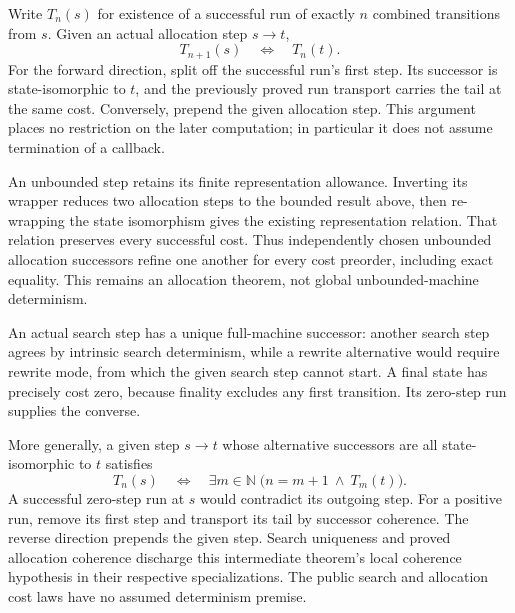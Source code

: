 Write $T_n(s)$ for existence of a successful run of exactly $n$ combined
transitions from $s$. Given an actual allocation step $s\to t$,
\[
 T_{n+1}(s)\quad\Longleftrightarrow\quad T_n(t).
\]
For the forward direction, split off the successful run's first step. Its
successor is state-isomorphic to $t$, and the previously proved run transport
carries the tail at the same cost. Conversely, prepend the given allocation
step. This argument places no restriction on the later computation; in
particular it does not assume termination of a callback.


An unbounded step retains its finite representation allowance. Inverting its
wrapper reduces two allocation steps to the bounded result above, then
re-wrapping the state isomorphism gives the existing representation relation.
That relation preserves every successful cost. Thus independently chosen
unbounded allocation successors refine one another for every cost preorder,
including exact equality. This remains an allocation theorem, not global
unbounded-machine determinism.



An actual search step has a unique full-machine successor: another search
step agrees by intrinsic search determinism, while a rewrite alternative
would require rewrite mode, from which the given search step cannot start.
A final state has precisely cost zero, because finality excludes any first
transition. Its zero-step run supplies the converse.



More generally, a given step $s\to t$ whose alternative successors are all
state-isomorphic to $t$ satisfies
\[
 T_n(s)\quad\Longleftrightarrow\quad
 \exists m\in\mathbb N\;\bigl(n=m+1\ \land\ T_m(t)\bigr).
\]
A successful zero-step run at $s$ would contradict its outgoing step. For a
positive run, remove its first step and transport its tail by successor
coherence. The reverse direction prepends the given step. Search uniqueness
and proved allocation coherence discharge this intermediate theorem's local
coherence hypothesis in their respective specializations. The public search
and allocation cost laws have no assumed determinism premise.

